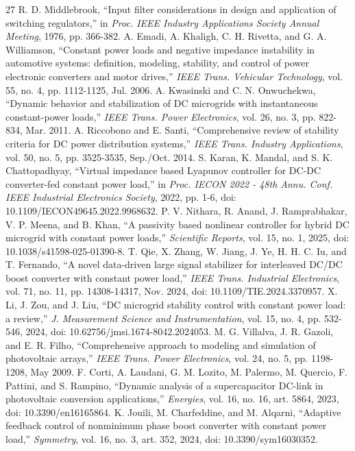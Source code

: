 \documentclass[journal]{IEEEtran}
\begin{document}
\begin{thebibliography}{27}
 R. D. Middlebrook, ``Input filter considerations in design and application of switching regulators,'' in \emph{Proc. IEEE Industry Applications Society Annual Meeting}, 1976, pp. 366-382.
 A. Emadi, A. Khaligh, C. H. Rivetta, and G. A. Williamson, ``Constant power loads and negative impedance instability in automotive systems: definition, modeling, stability, and control of power electronic converters and motor drives,'' \emph{IEEE Trans. Vehicular Technology}, vol. 55, no. 4, pp. 1112-1125, Jul. 2006.
 A. Kwasinski and C. N. Onwuchekwa, ``Dynamic behavior and stabilization of DC microgrids with instantaneous constant-power loads,'' \emph{IEEE Trans. Power Electronics}, vol. 26, no. 3, pp. 822-834, Mar. 2011.
 A. Riccobono and E. Santi, ``Comprehensive review of stability criteria for DC power distribution systems,'' \emph{IEEE Trans. Industry Applications}, vol. 50, no. 5, pp. 3525-3535, Sep./Oct. 2014.
 S. Karan, K. Mandal, and S. K. Chattopadhyay, ``Virtual impedance based Lyapunov controller for DC-DC converter-fed constant power load,'' in \emph{Proc. IECON 2022 - 48th Annu. Conf. IEEE Industrial Electronics Society}, 2022, pp. 1-6, doi: 10.1109/IECON49645.2022.9968632.
 P. V. Nithara, R. Anand, J. Ramprabhakar, V. P. Meena, and B. Khan, ``A passivity based nonlinear controller for hybrid DC microgrid with constant power loads,'' \emph{Scientific Reports}, vol. 15, no. 1, 2025, doi: 10.1038/s41598-025-01390-8.
 T. Qie, X. Zhang, W. Jiang, J. Ye, H. H. C. Iu, and T. Fernando, ``A novel data-driven large signal stabilizer for interleaved DC/DC boost converter with constant power load,'' \emph{IEEE Trans. Industrial Electronics}, vol. 71, no. 11, pp. 14308-14317, Nov. 2024, doi: 10.1109/TIE.2024.3370957.
 X. Li, J. Zou, and J. Liu, ``DC microgrid stability control with constant power load: a review,'' \emph{J. Measurement Science and Instrumentation}, vol. 15, no. 4, pp. 532-546, 2024, doi: 10.62756/jmsi.1674-8042.2024053.
 M. G. Villalva, J. R. Gazoli, and E. R. Filho, ``Comprehensive approach to modeling and simulation of photovoltaic arrays,'' \emph{IEEE Trans. Power Electronics}, vol. 24, no. 5, pp. 1198-1208, May 2009.
 F. Corti, A. Laudani, G. M. Lozito, M. Palermo, M. Quercio, F. Pattini, and S. Rampino, ``Dynamic analysis of a supercapacitor DC-link in photovoltaic conversion applications,'' \emph{Energies}, vol. 16, no. 16, art. 5864, 2023, doi: 10.3390/en16165864.
 K. Jouili, M. Charfeddine, and M. Alqarni, ``Adaptive feedback control of nonminimum phase boost converter with constant power load,'' \emph{Symmetry}, vol. 16, no. 3, art. 352, 2024, doi: 10.3390/sym16030352.

\end{thebibliography}
\end{document}
